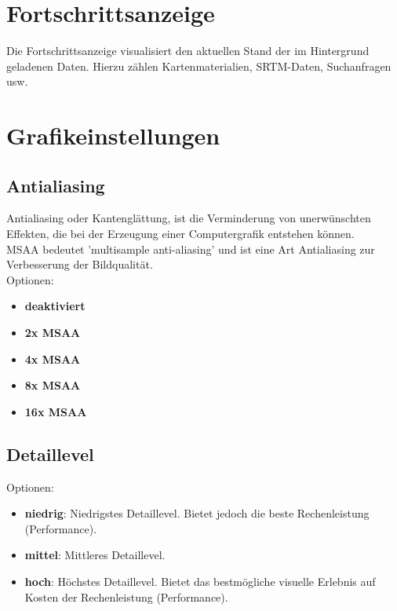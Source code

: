 \documentclass[10pt]{scrreprt}
\begin{document}
\newpage
\vspace{3mm}
\section{Fortschrittsanzeige} 
Die Fortschrittsanzeige visualisiert den aktuellen Stand der im Hintergrund geladenen Daten. Hierzu zählen Kartenmaterialien, SRTM-Daten, Suchanfragen usw.



\vspace{3mm}
\section{Grafikeinstellungen} 

\vspace{3mm}
\subsection{Antialiasing}  

Antialiasing oder Kantenglättung, ist die Verminderung von unerwünschten Effekten, die bei der Erzeugung einer Computergrafik entstehen können.\\

MSAA bedeutet 'multisample anti-aliasing' und ist eine Art Antialiasing zur Verbesserung der Bildqualität.\\

Optionen:
\begin{itemize}
\item \textbf{deaktiviert}
\item \textbf{2x MSAA}
\item \textbf{4x MSAA}
\item \textbf{8x MSAA}
\item \textbf{16x MSAA}
\end{itemize}


\vspace{3mm}
\subsection{Detaillevel}  

Optionen:
\begin{itemize}
\item \textbf{niedrig}: Niedrigstes Detaillevel. Bietet jedoch die beste Rechenleistung (Performance).
\item \textbf{mittel}: Mittleres Detaillevel.
\item \textbf{hoch}: Höchstes Detaillevel. Bietet das bestmögliche visuelle Erlebnis auf Kosten der Rechenleistung (Performance).
\end{itemize}
\end{document}
